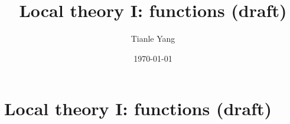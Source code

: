 \documentclass{noteformyself}
\title{Local theory I: functions (draft)}
\author{Tianle Yang}
\date{\today}
\begin{document}
    \maketitle

    \section{Local theory I: functions (draft)}



\end{document}
